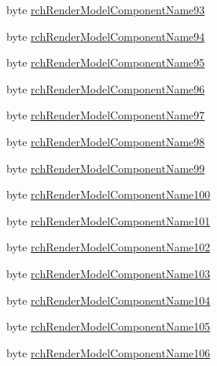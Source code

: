 \begin{DoxyCompactItemize}
\item 
byte \mbox{\hyperlink{struct_valve_1_1_v_r_1_1_input_origin_info__t_a849070e63158e4d7aa9695813df5bdc7}{rch\+Render\+Model\+Component\+Name93}}
\item 
byte \mbox{\hyperlink{struct_valve_1_1_v_r_1_1_input_origin_info__t_a499e51d54816c777a0dc8cdd584a69ef}{rch\+Render\+Model\+Component\+Name94}}
\item 
byte \mbox{\hyperlink{struct_valve_1_1_v_r_1_1_input_origin_info__t_a9d25be82a919ebd7bcc128ff6edaf129}{rch\+Render\+Model\+Component\+Name95}}
\item 
byte \mbox{\hyperlink{struct_valve_1_1_v_r_1_1_input_origin_info__t_ac4d186b9c89333d005a0d3a5fd0b7f09}{rch\+Render\+Model\+Component\+Name96}}
\item 
byte \mbox{\hyperlink{struct_valve_1_1_v_r_1_1_input_origin_info__t_a665c4614c5c4e11931906a819a5f5bbf}{rch\+Render\+Model\+Component\+Name97}}
\item 
byte \mbox{\hyperlink{struct_valve_1_1_v_r_1_1_input_origin_info__t_abc755e7360e736778debc35092383ab4}{rch\+Render\+Model\+Component\+Name98}}
\item 
byte \mbox{\hyperlink{struct_valve_1_1_v_r_1_1_input_origin_info__t_a2d8adf3eefd32d112b028683d62d7a73}{rch\+Render\+Model\+Component\+Name99}}
\item 
byte \mbox{\hyperlink{struct_valve_1_1_v_r_1_1_input_origin_info__t_a59f613e97c47bc69130356d86bcaddeb}{rch\+Render\+Model\+Component\+Name100}}
\item 
byte \mbox{\hyperlink{struct_valve_1_1_v_r_1_1_input_origin_info__t_a3f33c3f481a2e9a4dd4bae7c7a6dc72b}{rch\+Render\+Model\+Component\+Name101}}
\item 
byte \mbox{\hyperlink{struct_valve_1_1_v_r_1_1_input_origin_info__t_aece48f62b1928f00f475340c7d966f6d}{rch\+Render\+Model\+Component\+Name102}}
\item 
byte \mbox{\hyperlink{struct_valve_1_1_v_r_1_1_input_origin_info__t_a1d8d0a569dfe264c2f661f3a847f93f7}{rch\+Render\+Model\+Component\+Name103}}
\item 
byte \mbox{\hyperlink{struct_valve_1_1_v_r_1_1_input_origin_info__t_ac34184f0af465e54de9f7e105730428a}{rch\+Render\+Model\+Component\+Name104}}
\item 
byte \mbox{\hyperlink{struct_valve_1_1_v_r_1_1_input_origin_info__t_a3f409a677120421f781c22aebfcb3aae}{rch\+Render\+Model\+Component\+Name105}}
\item 
byte \mbox{\hyperlink{struct_valve_1_1_v_r_1_1_input_origin_info__t_a98c369002b174c80dfb08a46afcb32b9}{rch\+Render\+Model\+Component\+Name106}}

\end{DoxyCompactItemize}

